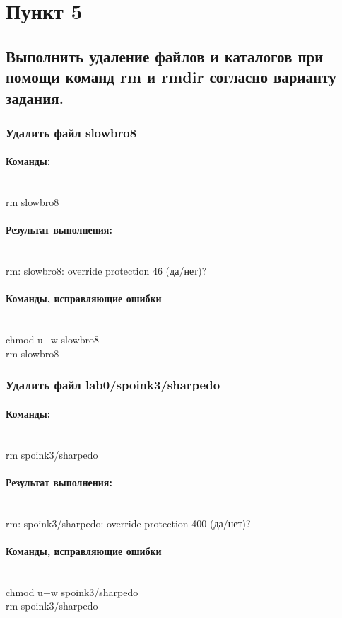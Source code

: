 \documentclass[12pt,onecolumn]{article}
\begin{document}
\section{Пункт 5}
\subsection{Выполнить удаление файлов и каталогов при помощи команд rm и rmdir согласно варианту задания.}
\subsubsection{Удалить файл slowbro8}
\paragraph{Команды:}
\hfill\\
rm slowbro8
\paragraph{Результат выполнения: }
\hfill\\
rm: slowbro8: override protection 46 (да/нет)?
\paragraph{Команды, исправляющие ошибки}
\hfill\\
chmod u+w slowbro8\\
rm slowbro8\\
\subsubsection{Удалить файл lab0/spoink3/sharpedo}
\paragraph{Команды:}
\hfill\\
rm spoink3/sharpedo
\paragraph{Результат выполнения: }
\hfill\\
rm: spoink3/sharpedo: override protection 400 (да/нет)?
\paragraph{Команды, исправляющие ошибки}
\hfill\\
chmod u+w spoink3/sharpedo\\
rm spoink3/sharpedo\\
\end{document}

